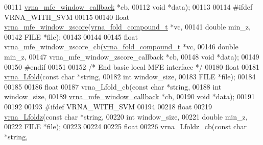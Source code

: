 \begin{DoxyCode}
00111                          \hyperlink{group__mfe__window_ga4f3e5bc214ef803074ace313cb9571b4}{vrna\_mfe\_window\_callback} *cb,
00112                          \textcolor{keywordtype}{void}                     *data);
00113 
00114 \textcolor{preprocessor}{#ifdef VRNA\_WITH\_SVM}
00115 
00140 \textcolor{keywordtype}{float} \hyperlink{group__mfe__window_gaa4f67ae94efd08d800c17f9b53423fd6}{vrna\_mfe\_window\_zscore}(\hyperlink{group__fold__compound_structvrna__fc__s}{vrna\_fold\_compound\_t} *vc,
00141                              \textcolor{keywordtype}{double}               min\_z,
00142                              FILE                 *file);
00143 
00144 
00145 \textcolor{keywordtype}{float} vrna\_mfe\_window\_zscore\_cb(\hyperlink{group__fold__compound_structvrna__fc__s}{vrna\_fold\_compound\_t}            *vc,
00146                                 \textcolor{keywordtype}{double}                          min\_z,
00147                                 vrna\_mfe\_window\_zscore\_callback *cb,
00148                                 \textcolor{keywordtype}{void}                            *data);
00149 
00150 \textcolor{preprocessor}{#endif}
00151 
00152 \textcolor{comment}{/* End basic local MFE interface */}
00180 \textcolor{keywordtype}{float}
00181 \hyperlink{group__mfe__window_ga4918cce52bf69c1913cda503b2ac75d8}{vrna\_Lfold}(\textcolor{keyword}{const} \textcolor{keywordtype}{char} *\textcolor{keywordtype}{string},
00182            \textcolor{keywordtype}{int}        window\_size,
00183            FILE       *file);
00184 
00185 
00186 \textcolor{keywordtype}{float}
00187 vrna\_Lfold\_cb(\textcolor{keyword}{const} \textcolor{keywordtype}{char}                *\textcolor{keywordtype}{string},
00188               \textcolor{keywordtype}{int}                       window\_size,
00189               \hyperlink{group__mfe__window_ga4f3e5bc214ef803074ace313cb9571b4}{vrna\_mfe\_window\_callback}  *cb,
00190               \textcolor{keywordtype}{void}                      *data);
00191 
00192 
00193 \textcolor{preprocessor}{#ifdef VRNA\_WITH\_SVM}
00194 
00218 \textcolor{keywordtype}{float}
00219 \hyperlink{group__mfe__window_ga27fddda5fc63eb49c861e38845fc34b4}{vrna\_Lfoldz}(\textcolor{keyword}{const} \textcolor{keywordtype}{char}  *\textcolor{keywordtype}{string},
00220             \textcolor{keywordtype}{int}         window\_size,
00221             \textcolor{keywordtype}{double}      min\_z,
00222             FILE        *file);
00223 
00224 
00225 \textcolor{keywordtype}{float}
00226 vrna\_Lfoldz\_cb(\textcolor{keyword}{const} \textcolor{keywordtype}{char}                       *\textcolor{keywordtype}{string},

\end{DoxyCode}
